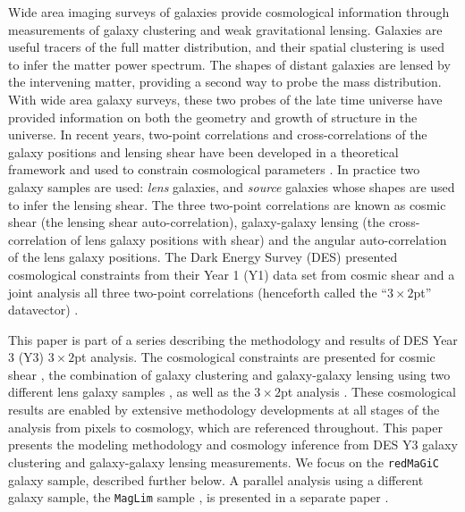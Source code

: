 \documentclass[fleqn,usenatbib]{mnras}
\newcommand{\redmagic}{\texttt{redMaGiC} }
\newcommand{\maglim}{\texttt{MagLim} }
\begin{document}
Wide area imaging surveys of galaxies provide cosmological information through measurements of galaxy clustering and weak gravitational lensing. Galaxies are useful tracers of the full matter distribution, and their spatial clustering is used to infer the matter power spectrum. The shapes of distant galaxies are lensed by the intervening matter, providing a second way to probe the mass distribution. With wide area galaxy surveys, these two probes of the late time universe have provided  information on both the geometry and growth of structure in the universe. 
In recent years, two-point correlations and cross-correlations of the galaxy positions and lensing shear have been developed in a theoretical framework \citep{Cacciato_2009,Baldauf_2010,Cacciato_2012,van_den_Bosch_2013} and used to constrain cosmological parameters  \citep{Cacciato_2013,Mandelbaum_2013,Kwan_2016,More_2015,Dvornik_2018,Coupon_2015}. In practice two galaxy samples are used:  {\it lens} galaxies, and {\it source} galaxies whose shapes are used to infer the lensing shear. The three two-point correlations are known as cosmic shear (the lensing shear auto-correlation), galaxy-galaxy lensing (the cross-correlation of lens galaxy positions with shear) and the angular auto-correlation of the lens galaxy positions.
The Dark Energy Survey (DES) presented cosmological constraints from their Year 1 (Y1) data set from cosmic shear \citep{Troxel_2018} and a joint analysis all three two-point correlations (henceforth called the ``$3\times2$pt'' datavector) \citep{Abbott_2018}. 

This paper is part of a series describing the methodology and results of DES Year 3 (Y3) $3\times2$pt analysis. The cosmological constraints are presented for cosmic shear \citep{y3-cosmicshear1,y3-cosmicshear2}, the combination of galaxy clustering and galaxy-galaxy lensing using two different lens galaxy samples \citep[this paper; ][]{y3-2x2ptaltlensresults}, as well as the $3\times2$pt analysis \citep{y3-3x2ptkp}. These cosmological results are enabled by extensive methodology developments at all stages of the analysis from pixels to cosmology, which are referenced throughout. This paper presents the modeling methodology and cosmology inference from DES Y3 galaxy clustering \citep{y3-galaxyclustering} and galaxy-galaxy lensing \citep{y3-gglensing} measurements. 
We focus on the \redmagic \citep{Rozo_2016} galaxy sample, described further below. A parallel analysis using a different galaxy sample, the \maglim sample \citep{y3-2x2maglimforecast}, is presented in a separate paper \citep{y3-2x2ptaltlensresults}.
\end{document}
